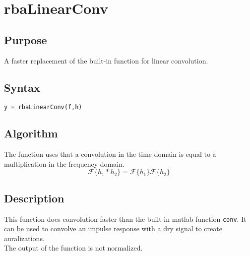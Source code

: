 
\chapter{rbaLinearConv} %
\label{cha:rbaLinearConv} %

\section{Purpose} %
\label{sec:rbaLinearConv_purpose}
A faster replacement of the built-in function for linear convolution.



\section{Syntax} %
\label{sec:rbaLinearConv_syntax}
\texttt{y = rbaLinearConv(f,h)}


\section{Algorithm} %
\label{sec:rbaLinearConv_algorithm}
The function uses that a convolution in the time domain is equal to a multiplication in the frequency domain.
\begin{equation*}
\mathcal{F}\{h_1 * h_2\} =  \mathcal{F}\{h_1\}\mathcal{F}\{h_2\}
\end{equation*}


\section{Description} %
\label{sec:rbaLinearConv_description}
This function does convolution faster than the built-in matlab function \texttt{conv}. It can be used to convolve an impulse response with a dry signal to create auralizations.\\

The output of the function is not normalized.




